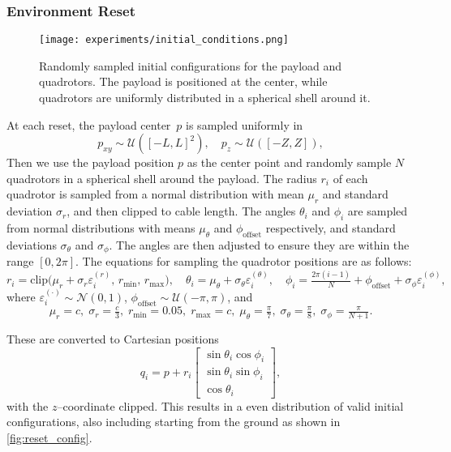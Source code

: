 \subsubsection{Environment Reset}
\label{sec:reset}
\begin{figure}
    \centering
    \texttt{[image: experiments/initial\_conditions.png]}
    \caption[Harsh conditions generation]{Randomly sampled initial configurations for the payload and quadrotors. The payload is positioned at the center, while quadrotors are uniformly distributed in a spherical shell around it.}
    \label{fig:reset_config}
\end{figure}
At each reset, the payload center~$p$ is sampled uniformly in
\[
p_{xy}\sim\mathcal{U}([-L,L]^2),\quad p_z\sim\mathcal{U}([-Z,Z]),
\]
Then we use the payload position $p$ as the center point and randomly sample $N$ quadrotors in a spherical shell around the payload. The radius $r_i$ of each quadrotor is sampled from a normal distribution with mean $\mu_r$ and standard deviation $\sigma_r$, and then clipped to cable length. The angles $\theta_i$ and $\phi_i$ are sampled from normal distributions with means $\mu_\theta$ and $\phi_{\mathrm{offset}}$ respectively, and standard deviations $\sigma_\theta$ and $\sigma_\phi$. The angles are then adjusted to ensure they are within the range $[0, 2\pi]$. The equations for sampling the quadrotor positions are as follows:
\[
r_i = \mathrm{clip}\bigl(\mu_r+\sigma_r\varepsilon_i^{(r)},\,r_{\min},\,r_{\max}\bigr),\quad
\theta_i = \mu_\theta+\sigma_\theta\varepsilon_i^{(\theta)},\quad
\phi_i = \tfrac{2\pi(i-1)}{N} + \phi_{\mathrm{offset}} + \sigma_\phi\varepsilon_i^{(\phi)},
\]
where $\varepsilon_i^{(\cdot)}\!\sim\mathcal{N}(0,1)$, $\phi_{\mathrm{offset}}\!\sim\mathcal{U}(-\pi,\pi)$, and
\[
\mu_r=c,\;\sigma_r=\tfrac{c}{3},\;r_{\min}=0.05,\;r_{\max}=c,\;
\mu_\theta=\tfrac{\pi}{7},\;\sigma_\theta=\tfrac{\pi}{8},\;\sigma_\phi=\tfrac{\pi}{N+1}.
\]

These are converted to Cartesian positions
\[
q_i = p + r_i
\begin{bmatrix}
\sin\theta_i\cos\phi_i\\
\sin\theta_i\sin\phi_i\\
\cos\theta_i
\end{bmatrix},
\]
with the $z$–coordinate clipped. 
This results in a even distribution of valid initial configurations, also including starting from the ground as shown in \autoref{fig:reset_config}. 



